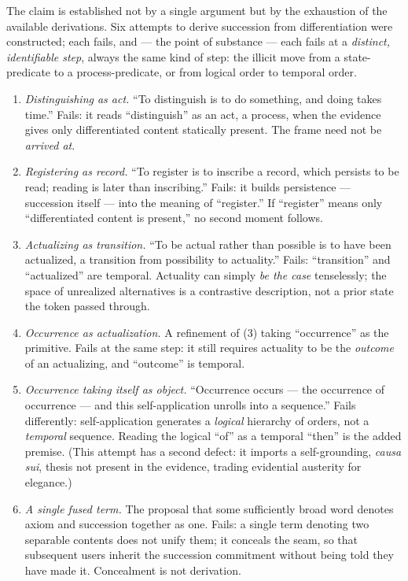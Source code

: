 \documentclass[
]{article}
\begin{document}
The claim is established not by a single argument but by the exhaustion
of the available derivations. Six attempts to derive succession from
differentiation were constructed; each fails, and --- the point of
substance --- each fails at a \emph{distinct, identifiable step}, always
the same kind of step: the illicit move from a state-predicate to a
process-predicate, or from logical order to temporal order.

\begin{enumerate}
\def\labelenumi{\arabic{enumi}.}
\item
  \emph{Distinguishing as act.} ``To distinguish is to do something, and
  doing takes time.'' Fails: it reads ``distinguish'' as an act, a
  process, when the evidence gives only differentiated content
  statically present. The frame need not be \emph{arrived at}.
\item
  \emph{Registering as record.} ``To register is to inscribe a record,
  which persists to be read; reading is later than inscribing.'' Fails:
  it builds persistence --- succession itself --- into the meaning of
  ``register.'' If ``register'' means only ``differentiated content is
  present,'' no second moment follows.
\item
  \emph{Actualizing as transition.} ``To be actual rather than possible
  is to have been actualized, a transition from possibility to
  actuality.'' Fails: ``transition'' and ``actualized'' are temporal.
  Actuality can simply \emph{be the case} tenselessly; the space of
  unrealized alternatives is a contrastive description, not a prior
  state the token passed through.
\item
  \emph{Occurrence as actualization.} A refinement of (3) taking
  ``occurrence'' as the primitive. Fails at the same step: it still
  requires actuality to be the \emph{outcome} of an actualizing, and
  ``outcome'' is temporal.
\item
  \emph{Occurrence taking itself as object.} ``Occurrence occurs --- the
  occurrence of occurrence --- and this self-application unrolls into a
  sequence.'' Fails differently: self-application generates a
  \emph{logical} hierarchy of orders, not a \emph{temporal} sequence.
  Reading the logical ``of'' as a temporal ``then'' is the added
  premise. (This attempt has a second defect: it imports a
  self-grounding, \emph{causa sui}, thesis not present in the evidence,
  trading evidential austerity for elegance.)
\item
  \emph{A single fused term.} The proposal that some sufficiently broad
  word denotes axiom and succession together as one. Fails: a single
  term denoting two separable contents does not unify them; it conceals
  the seam, so that subsequent users inherit the succession commitment
  without being told they have made it. Concealment is not derivation.
\end{enumerate}
\end{document}
